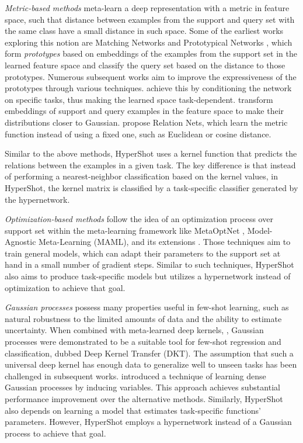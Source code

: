 \documentclass[nohyperref]{article}
\def\our{HyperShot}
\theoremstyle{plain}
\theoremstyle{definition}
\theoremstyle{remark}
\begin{document}
{\em Metric-based methods} meta-learn a deep representation with a metric in feature space, such that distance between examples from the support and query set with the same class have a small distance in such space. Some of the earliest works exploring this notion are Matching Networks \cite{vinyals2016matching} and Prototypical Networks \cite{snell2017prototypical}, which form \textit{prototypes} based on embeddings of the examples from the support set in the learned feature space and classify the query set based on the distance to those prototypes. Numerous subsequent works aim to improve the expressiveness of the prototypes through various techniques. \cite{oreshkin2018tadam} achieve this by conditioning the network on specific tasks, thus making the learned space task-dependent.  \cite{hu2021leveraging} transform embeddings of support and query examples in the feature space to make their distributions closer to Gaussian.
\cite{sung2018learning} propose Relation Nets, which learn the metric function instead of using a fixed one, such as Euclidean or cosine distance. 

Similar to the above methods, \our{} uses a kernel function that predicts the relations between the examples in a given task. The key difference is that instead of performing a nearest-neighbor classification based on the kernel values, in \our{}, the kernel matrix is classified by a task-specific classifier generated by the hypernetwork.

{\em Optimization-based methods} follow the idea of an optimization process over support set within the meta-learning framework like MetaOptNet \cite{lee2019meta}, Model-Agnostic Meta-Learning (MAML), and its extensions \cite{finn2017model,nichol2018first,raghu2019rapid,rajeswaran2019meta,finn2018probabilistic,nichol2018first}. Those techniques aim to train general models, which can adapt their parameters to the support set at hand in a small number of gradient steps. Similar to such techniques, \our{} also aims to produce task-specific models but utilizes a hypernetwork instead of optimization to achieve that goal. 


{\em Gaussian processes} \cite{rasmussen2003gaussian} possess many properties useful in few-shot learning, such as natural robustness to the limited amounts of data and the ability to estimate uncertainty. When combined with meta-learned deep kernels,  \cite{patacchiola2020bayesian}, Gaussian processes were demonstrated to be a suitable tool for few-shot regression and classification, dubbed Deep Kernel Transfer (DKT). The assumption that such a universal deep kernel has enough data to generalize well to unseen tasks has been challenged in subsequent works. \cite{wang2021learning} introduced a technique of learning dense Gaussian processes by inducing variables. This approach achieves substantial performance improvement over the alternative methods. Similarly, \our{} also depends on learning a model that estimates task-specific functions' parameters. However, \our{} employs a hypernetwork instead of a Gaussian process to achieve that goal. 
\end{document}
